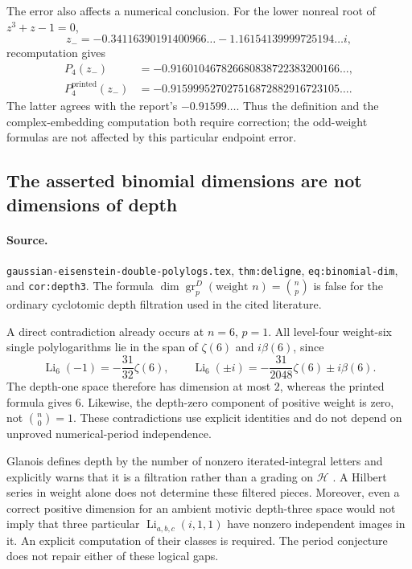 \documentclass[11pt,a4paper]{article}
\DeclareMathOperator{\Li}{Li}
\theoremstyle{definition}
\theoremstyle{remark}
\numberwithin{equation}{section}
\begin{document}
The error also affects a numerical conclusion. For the lower nonreal
root of $z^3+z-1=0$,
\[
z_-=-0.34116390191400966\ldots-1.16154139999725194\ldots i,
\]
recomputation gives
\begin{align*}
 P_4(z_-)&=-0.916010467826680838722383200166\ldots,\\
 P_4^{\mathrm{printed}}(z_-)&=-0.915999527027516872882916723105\ldots.
\end{align*}
The latter agrees with the report's $-0.91599\ldots$.
Thus the definition and the complex-embedding computation both require
correction; the odd-weight formulas are not affected by this particular
endpoint error.

\subsection{The asserted binomial dimensions are not dimensions of depth}
\label{audit:poly:depth-dimensions}

\paragraph{Source.}
\texttt{gaussian-eisenstein-double-polylogs.tex},
\texttt{thm:deligne}, \texttt{eq:binomial-dim}, and
\texttt{cor:depth3}. The formula
$\dim\operatorname{gr}^D_p(\text{weight }n)=\binom np$
is false for the ordinary cyclotomic depth filtration used in the cited
literature.

A direct contradiction already occurs at $n=6$, $p=1$. All level-four
weight-six single polylogarithms lie in the span of $\zeta(6)$ and
$i\beta(6)$, since
\[
 \Li_6(-1)=-\frac{31}{32}\zeta(6),\qquad
 \Li_6(\pm i)=-\frac{31}{2048}\zeta(6)\pm i\beta(6).
\]
The depth-one space therefore has dimension at most $2$, whereas the
printed formula gives $6$. Likewise, the depth-zero component of positive
weight is zero, not $\binom n0=1$.
These contradictions use explicit identities and do not depend on
unproved numerical-period independence.

Glanois defines depth by the number of nonzero iterated-integral letters
and explicitly warns that it is a filtration rather than a grading on
$\mathcal H$ \cite[\S3.1]{audit-glanois-2016}.
A Hilbert series in weight alone does not determine these filtered
pieces. Moreover, even a correct positive dimension for an ambient
motivic depth-three space would not imply that three particular
$\Li_{a,b,c}(i,1,1)$ have nonzero independent images in it.
An explicit computation of their classes is required.
The period conjecture does not repair either of these logical gaps.
\end{document}
